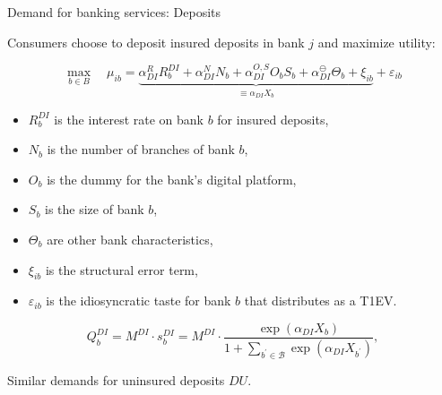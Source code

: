 \documentclass[notes,10pt, aspectratio=169]{beamer}
\newenvironment{wideitemize}{\itemize\addtolength{\itemsep}{10pt}}{\enditemize}
\begin{document}
\begin{frame}{ Demand for banking services: Deposits}

    \begin{wideitemize}

        \item Consumers choose to deposit insured deposits in bank $j$ and maximize utility:
        
        $$
        \max _{b \in B} \quad \mu_{i b}=\underbrace{\alpha_{D I}^R R_b^{D I}+\alpha_{D I}^N N_b+\alpha_{D I}^{O, S} O_b S_b+\alpha_{D I}^{\ominus} \Theta_b+\xi_{i b}}_{\equiv \alpha_{D I} X_b}+\varepsilon_{i b}
        $$

        \begin{itemize}
            \item $R_b^{D I}$ is the interest rate on bank $b$ for insured deposits,
            \item $N_b$ is the number of branches of bank $b$,
            \item $O_b$ is the dummy for the bank's digital platform,
            \item $S_b$ is the size of bank $b$,
            \item $\Theta_b$ are other bank characteristics,
            \item $\xi_{i b}$ is the structural error term,
            \item $\varepsilon_{i b}$ is the idiosyncratic taste for bank $b$ that distributes as a T1EV.
        \end{itemize}

     $$ Q_b^{D I}=M^{D I} \cdot s_b^{D I}=M^{D I} \cdot \frac{\exp \left(\alpha_{D I} X_b\right)}{1+\sum_{b^{\prime} \in \mathcal{B}} \exp \left(\alpha_{D I} X_{b^{\prime}}\right)},$$
\item Similar demands for uninsured deposits $DU$.
    \end{wideitemize}


    \end{frame}
\end{document}
